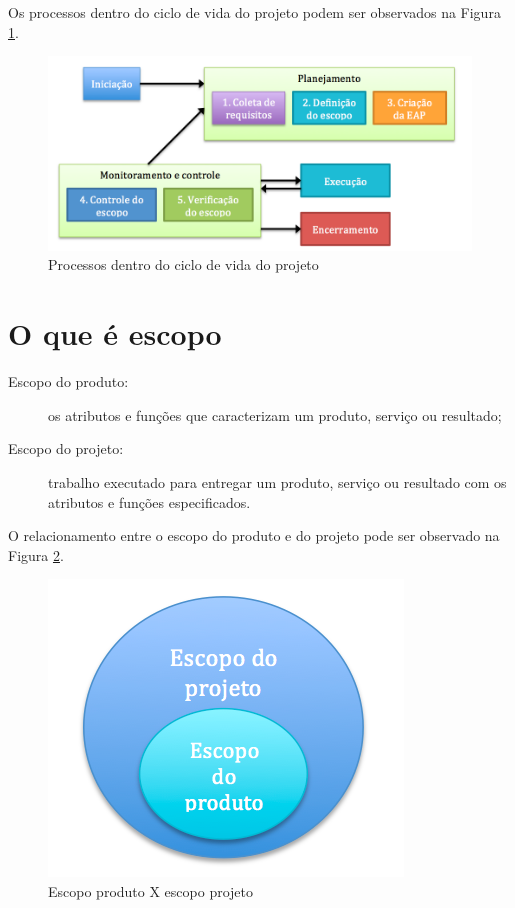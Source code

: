 Os processos dentro do ciclo de vida do projeto podem ser observados na Figura \ref{fig:ciclo:vida}.

\begin{figure}[!h]
	\centering
	\includegraphics[scale=0.5]{Figuras/ciclo_vida.png}
	\caption{Processos dentro do ciclo de vida do projeto}
	\label{fig:ciclo:vida}
\end{figure}

\section{O que é escopo}

\begin{description}
	
	\item[Escopo do produto:] os atributos e funções que caracterizam um produto, serviço ou resultado;
	
	\item[Escopo do projeto:] trabalho executado para entregar um produto, serviço ou resultado com os atributos e funções especificados.
	
\end{description}

O relacionamento entre o escopo do produto e do projeto pode ser observado na Figura \ref{fig:escopo:proj:prod}.

\begin{figure}[!h]
\centering
\includegraphics[scale=0.5]{Figuras/escopo_proj_prod.png}
\caption{Escopo produto X escopo projeto}
\label{fig:escopo:proj:prod}
\end{figure}

